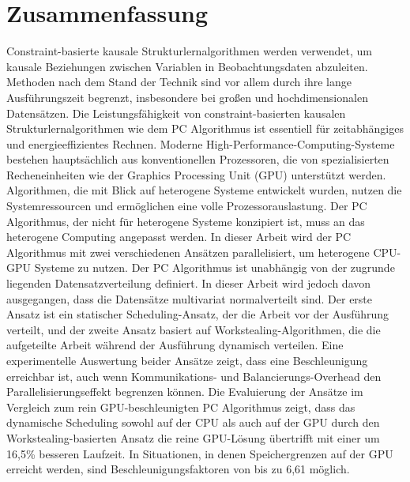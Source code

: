 \chapter*{Zusammenfassung}
Constraint-basierte kausale Strukturlernalgorithmen werden verwendet, um kausale Beziehungen zwischen Variablen in Beobachtungsdaten abzuleiten. Methoden nach dem Stand der Technik sind vor allem durch ihre lange Ausführungszeit begrenzt, insbesondere bei großen und hochdimensionalen Datensätzen. Die Leistungsfähigkeit von constraint-basierten kausalen Strukturlernalgorithmen wie dem PC Algorithmus ist essentiell für zeitabhängiges und energieeffizientes Rechnen. Moderne High-Performance-Computing-Systeme bestehen hauptsächlich aus konventionellen Prozessoren, die von spezialisierten Recheneinheiten wie der Graphics Processing Unit (GPU) unterstützt werden. Algorithmen, die mit Blick auf heterogene Systeme entwickelt wurden, nutzen die Systemressourcen und ermöglichen eine volle Prozessorauslastung. Der PC Algorithmus, der nicht für heterogene Systeme konzipiert ist, muss an das heterogene Computing angepasst werden. In dieser Arbeit wird der PC Algorithmus mit zwei verschiedenen Ansätzen parallelisiert, um heterogene CPU-GPU Systeme zu nutzen. Der PC Algorithmus ist unabhängig von der zugrunde liegenden Datensatzverteilung definiert. In dieser Arbeit wird jedoch davon ausgegangen, dass die Datensätze multivariat normalverteilt sind. Der erste Ansatz ist ein statischer Scheduling-Ansatz, der die Arbeit vor der Ausführung verteilt, und der zweite Ansatz basiert auf Workstealing-Algorithmen, die die aufgeteilte Arbeit während der Ausführung dynamisch verteilen. Eine experimentelle Auswertung beider Ansätze zeigt, dass eine Beschleunigung erreichbar ist, auch wenn Kommunikations- und Balancierungs-Overhead den Parallelisierungseffekt begrenzen können. Die Evaluierung der Ansätze im Vergleich zum rein GPU-beschleunigten PC Algorithmus zeigt, dass das dynamische Scheduling sowohl auf der CPU als auch auf der GPU durch den Workstealing-basierten Ansatz die reine GPU-Lösung übertrifft mit einer um 16,5\% besseren Laufzeit. In Situationen, in denen Speichergrenzen auf der GPU erreicht werden, sind Beschleunigungsfaktoren von bis zu 6,61 möglich.